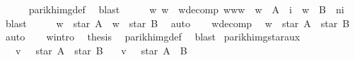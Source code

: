\begin{isabellebody}
\ \ \ \ \isamarkupfalse%
\ parikh{\isacharunderscore}{\kern0pt}img{\isacharunderscore}{\kern0pt}def\ \isamarkupfalse%
\ blast\isanewline
\ \ \isamarkupfalse%
\ \isamarkupfalse%
\ w{}\ w{}\ \ w{\isacharunderscore}{\kern0pt}decomp{\isacharcolon}{\kern0pt}\ {\isachardoublequoteopen}w{\isacharequal}{\kern0pt}w{}{\isacharat}{\kern0pt}w{}\ {\isasymand}\ w{}\ {\isasymin}\ A\ {\isacharcircum}{\kern0pt}{\isacharcircum}{\kern0pt}\ i\ {\isasymand}\ w{}\ {\isasymin}\ B\ {\isacharcircum}{\kern0pt}{\isacharcircum}{\kern0pt}\ {\isacharparenleft}{\kern0pt}n{\isacharminus}{\kern0pt}i{\isacharparenright}{\kern0pt}{\isachardoublequoteclose}\ \isamarkupfalse%
\ blast\isanewline
\ \ \isamarkupfalse%
\ \isamarkupfalse%
\ {\isachardoublequoteopen}w{}\ {\isasymin}\ star\ A{\isachardoublequoteclose}\ \ {\isachardoublequoteopen}w{}\ {\isasymin}\ star\ B{\isachardoublequoteclose}\ \isamarkupfalse%
\ auto\isanewline
\ \ \isamarkupfalse%
\ w{\isacharunderscore}{\kern0pt}decomp\ \isamarkupfalse%
\ {\isachardoublequoteopen}w\ {\isasymin}\ star\ A\ {\isacharat}{\kern0pt}{\isacharat}{\kern0pt}\ star\ B{\isachardoublequoteclose}\ \isamarkupfalse%
\ auto\isanewline
\ \ \isamarkupfalse%
\ w{\isacharunderscore}{\kern0pt}intro\ \isamarkupfalse%
\ {\isacharquery}{\kern0pt}thesis\ \isamarkupfalse%
\ parikh{\isacharunderscore}{\kern0pt}img{\isacharunderscore}{\kern0pt}def\ \isamarkupfalse%
\ blast\isanewline
{}\isamarkupfalse%
%
\endisatagproof
{\isafoldproof}%
%
\isadelimproof
\isanewline
%
\endisadelimproof
\isanewline
{}\isamarkupfalse%
\ parikh{\isacharunderscore}{\kern0pt}img{\isacharunderscore}{\kern0pt}star{\isacharunderscore}{\kern0pt}aux{}{\isacharcolon}{\kern0pt}\isanewline
\ \ \ {\isachardoublequoteopen}v\ {\isasymin}\ {\isasymPsi}\ {\isacharparenleft}{\kern0pt}star\ A\ {\isacharat}{\kern0pt}{\isacharat}{\kern0pt}\ star\ B{\isacharparenright}{\kern0pt}{\isachardoublequoteclose}\isanewline
\ \ \ {\isachardoublequoteopen}v\ {\isasymin}\ {\isasymPsi}\ {\isacharparenleft}{\kern0pt}star\ {\isacharparenleft}{\kern0pt}A\ {\isasymunion}\ B{\isacharparenright}{\kern0pt}{\isacharparenright}{\kern0pt}{\isachardoublequoteclose}\isanewline

\end{isabellebody}

